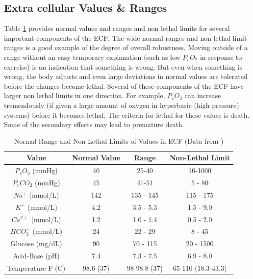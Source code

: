 \subsection{Extra cellular Values \& Ranges}

Table \ref{table:ecf_value_ranges} provides normal values and ranges and non lethal limits for several important components of the ECF.  The wide normal ranges and non lethal limit ranges is a good example of the degree of overall robustness. Moving outside of a range without an easy temporary explanation (such as low $P_v O_2$ in response to exercise) is an indication that something is wrong. But even when something is wrong, the body adjusts and even large deviations in normal values are tolerated before the changes become lethal. Several of these components of the ECF have larger non lethal limits in one direction. For example, $P_v O_2$ can increase tremendously (if given a large amount of oxygen in hyperbaric (high pressure) systems) before it becomes lethal. The criteria for lethal for these values is death. Some of the secondary effects may lead to premature death. 

\begin{table}[h!]
\centering
\begin{tabular}{||c c c c||} 
 \hline
Value & Normal Value & Range & Non-Lethal Limit\\ [0.5ex] 
 \hline\hline
 $P_v O_2$ (mmHg) & 40  & 25-40 & 10-1000 \\
 $P_v CO_2$ (mmHg) & 45 & 41-51 & 5 - 80\\ 
 $Na^+$ (mmol/L) & 142 & 135 - 145 & 115 - 175\\
 $K^+$  (mmol/L) & 4.2 & 3.5 - 5.3 & 1.5 - 9.0\\ 
 $Ca^{2+}$ (mmol/L) & 1.2 & 1.0 - 1.4 & 0.5 - 2.0 \\
 $HCO_3 ^-$ (mmol/L)& 24 & 22 - 29 & 8 - 45 \\
 Glucose (mg/dL)& 90 & 70 - 115 & 20 - 1500 \\
 Acid-Base (pH) & 7.4 & 7.3 - 7.5 & 6.9 - 8.0 \\
 Temperature F (C) & 98.6 (37) & 98-98.8 (37) & 65-110 (18.3-43.3)\\[1ex] 
 \hline
\end{tabular}
\caption{Normal Range and Non Lethal Limits of Values in ECF (\footnotesize{Data from \cite{feher_quantitative_2017}})}
\label{table:ecf_value_ranges}
\end{table}

